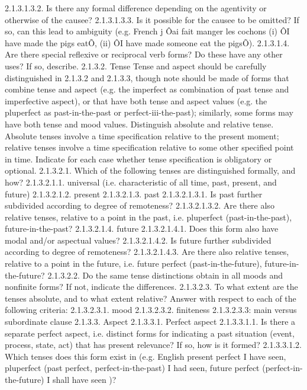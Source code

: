 2.1.3.1.3.2. Is there any formal difference depending on the agentivity or otherwise of the causee?
2.1.3.1.3.3. Is it possible for the causee to be omitted? If so, can this lead to ambiguity (e.g. French j Ôai fait manger les cochons (i) ÔI have made the pigs eatÕ, (ii) ÔI have made someone eat the pigsÕ).
2.1.3.1.4. Are there special reflexive or reciprocal verb forms? Do these have any other uses? If so, describe.
2.1.3.2. Tense
Tense and aspect should be carefully distinguished in 2.1.3.2 and 2.1.3.3, though note should be made of forms that combine tense and aspect (e.g. the imperfect as combination of past tense and imperfective aspect), or that have both tense and aspect values (e.g. the pluperfect as past-in-the-past or perfect-iii-the-past); similarly, some forms may have both tense and mood values.
Distinguish absolute and relative tense. Absolute tenses involve a time specification relative to the present moment; relative tenses involve a time specification relative to some other specified point in time.
Indicate for each case whether tense specification is obligatory or optional.
2.1.3.2.1. Which of the following tenses are distinguished formally, and how?
2.1.3.2.1.1. universal (i.e. characteristic of all time, past, present, and future)
2.1.3.2.1.2. present
2.1.3.2.1.3. past
2.1.3.2.1.3.1. Is past further subdivided according to degree of remoteness?
2.1.3.2.1.3.2. Are there also relative tenses, relative to a point in the past, i.e. pluperfect (past-in-the-past), future-in-the-past?
2.1.3.2.1.4. future
2.1.3.2.1.4.1. Does this form also have modal and/or aspectual values?
2.1.3.2.1.4.2. Is future further subdivided according to degree of remoteness?
2.1.3.2.1.4.3. Are there also relative tenses, relative to a point in the future, i.e. future perfect (past-in-the-future), future-in-the-future?
2.1.3.2.2. Do the same tense distinctions obtain in all moods and nonfinite forms? If not, indicate the differences.
2.1.3.2.3. To what extent are the tenses absolute, and to what extent relative? Answer with respect to each of the following criteria:
2.1.3.2.3.1. mood
2.1.3.2.3.2. finiteness
2.1.3.2.3.3: main versus subordinate clause
2.1.3.3. Aspect
2.1.3.3.1. Perfect aspect
2.1.3.3.1.1. Is there a separate perfect aspect, i.e. distinct forms for indicating a past situation (event, process, state, act) that has present relevance? If so, how is it formed?
2.1.3.3.1.2. Which tenses does this form exist in (e.g. English present perfect I have seen, pluperfect (past perfect, perfect-in-the-past) I had seen, future perfect (perfect-in-the-future) I shall have seen )?
